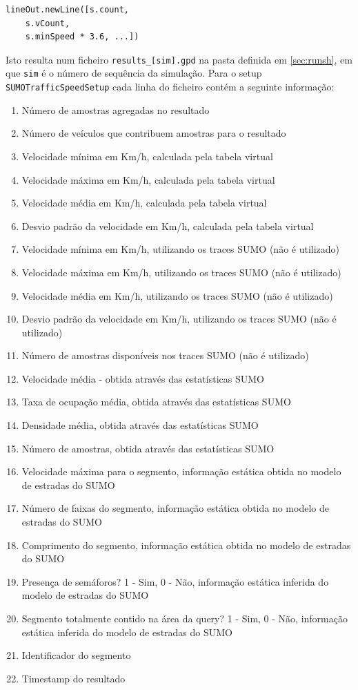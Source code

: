 \documentclass{article}
\newcommand{\tm}[1]{\texttt{#1}}
\begin{document}
\begin{Verbatim}
lineOut.newLine([s.count,
	s.vCount,
	s.minSpeed * 3.6, ...])
\end{Verbatim}

Isto resulta num ficheiro \tm{results\_[sim].gpd} na pasta definida em \ref{sec:runsh}, em que \tm{sim} é o número de sequência da simulação. Para o setup \tm{SUMOTrafficSpeedSetup} cada linha do ficheiro contém a seguinte informação:

\begin{enumerate}
\item Número de amostras agregadas no resultado
\item Número de veículos que contribuem amostras para o resultado
\item Velocidade mínima em Km/h, calculada pela tabela virtual
\item Velocidade máxima em Km/h, calculada pela tabela virtual
\item Velocidade média em Km/h, calculada pela tabela virtual
\item Desvio padrão da velocidade em Km/h, calculada pela tabela virtual
\item Velocidade mínima em Km/h, utilizando os traces SUMO (não é utilizado)
\item Velocidade máxima em Km/h, utilizando os traces SUMO (não é utilizado)
\item Velocidade média em Km/h, utilizando os traces SUMO (não é utilizado)
\item Desvio padrão da velocidade em Km/h, utilizando os traces SUMO (não é utilizado)
\item Número de amostras disponíveis nos traces SUMO (não é utilizado)
\item Velocidade média - obtida através das estatísticas SUMO
\item Taxa de ocupação média, obtida através das estatísticas SUMO
\item Densidade média, obtida através das estatísticas SUMO
\item Número de amostras, obtida através das estatísticas SUMO
\item Velocidade máxima para o segmento, informação estática obtida no modelo de estradas do SUMO
\item Número de faixas do segmento,  informação estática obtida no modelo de estradas do SUMO
\item Comprimento do segmento, informação estática obtida no modelo de estradas do SUMO
\item Presença de semáforos? 1 - Sim, 0 - Não, informação estática inferida do modelo de estradas do SUMO
\item Segmento totalmente contido na área da query? 1 - Sim, 0 - Não, informação estática inferida do modelo de estradas do SUMO
\item Identificador do segmento
\item Timestamp do resultado
\end{enumerate}
\end{document}
